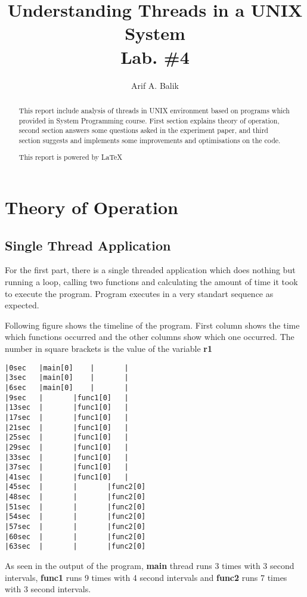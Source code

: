 \documentclass[11pt]{article}
\title{Understanding Threads in a UNIX System \\Lab. \#4}
\author{Arif A. Balik}
\affil{Undergraduate Student\\
	Sytstems Programming\\
	Department of Computer Science\\
	Arel University\\
	Büyükçekmece, İstanbul 34537\\
    Email: arifbalik@outlook.com
}
\begin{document}
\maketitle

\begin{abstract}
This report include analysis of threads in UNIX environment based on programs which provided in System Programming course. First section explains theory of operation, second section answers some questions asked in the experiment paper, and third section suggests and implements some improvements and optimisations on the code.

This report is powered by \LaTeX{}
\end{abstract}

\section*{Theory of Operation}

\subsection*{Single Thread Application}
For the first part, there is a single threaded application which does nothing but running a loop, calling two functions and calculating the amount of time it took to execute the program. Program executes in a very standart sequence as expected.

Following figure shows the timeline of the program. First column shows the time which functions occurred and the other columns show which one occurred. The number in square brackets is the value of the variable \textbf{r1}

\begin{minipage}{1\textwidth}
\begin{lstlisting}[title=Timeline (singlethread.c), frame=tlrb]
|0sec	|main[0]	|		|
|3sec	|main[0]	|		|
|6sec	|main[0]	|		|
|9sec	|		|func1[0]	|
|13sec	|		|func1[0]	|
|17sec	|		|func1[0]	|
|21sec	|		|func1[0]	|
|25sec	|		|func1[0]	|
|29sec	|		|func1[0]	|
|33sec	|		|func1[0]	|
|37sec	|		|func1[0]	|
|41sec	|		|func1[0]	|
|45sec	|		|		|func2[0]
|48sec	|		|		|func2[0]
|51sec	|		|		|func2[0]
|54sec	|		|		|func2[0]
|57sec	|		|		|func2[0]
|60sec	|		|		|func2[0]
|63sec	|		|		|func2[0]
\end{lstlisting}
\end{minipage}

As seen in the output of the program, \textbf{main} thread runs 3 times with 3 second intervals, \textbf{func1} runs 9 times with 4 second intervals and \textbf{func2} runs 7 times with 3 second intervals.
\end{document}
